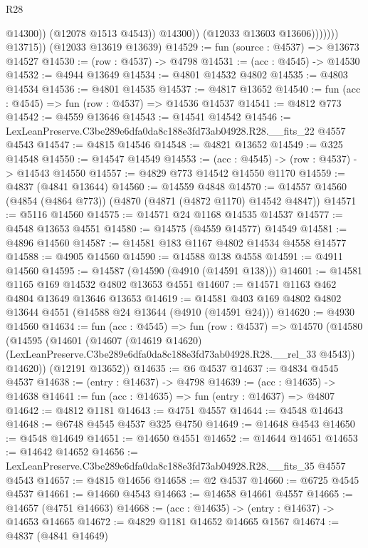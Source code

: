 \begin{lexlean}{R28}
\begin{coremodule}
                              @14300))
                          (@12078 @1513 @4543))
                        @14300))
                    (@12033 @13603 @13606)))))))
        @13715))
    (@12033 @13619 @13639)
@14529 := fun (source : @4537) => @13673 @14527
@14530 := (row : @4537) -> @4798
@14531 := (acc : @4545) -> @14530
@14532 := @4944 @13649
@14534 := @4801 @14532 @4802
@14535 := @4803 @14534
@14536 := @4801 @14535
@14537 := @4817 @13652
@14540 := fun (acc : @4545) => fun (row : @4537) => @14536 @14537
@14541 := @4812 @773
@14542 := @4559 @13646
@14543 := @14541 @14542
@14546 := LexLeanPreserve.C3be289e6dfa0da8c188e3fd73ab04928.R28.__fits_22 @4557 @4543
@14547 := @4815 @14546
@14548 := @4821 @13652
@14549 := @325 @14548
@14550 := @14547 @14549
@14553 := (acc : @4545) -> (row : @4537) -> @14543 @14550
@14557 := @4829 @773 @14542 @14550 @1170
@14559 := @4837 (@4841 @13644)
@14560 := @14559 @4848
@14570 := @14557 @14560 (@4854 (@4864 @773)) (@4870 (@4871 (@4872 @1170) @14542 @4847))
@14571 := @5116 @14560
@14575 := @14571 @24 @1168 @14535 @14537
@14577 := @4548 @13653 @4551
@14580 := @14575 (@4559 @14577) @14549
@14581 := @4896 @14560
@14587 := @14581 @183 @1167 @4802 @14534 @4558 @14577
@14588 := @4905 @14560
@14590 := @14588 @138 @4558
@14591 := @4911 @14560
@14595 := @14587 (@14590 (@4910 (@14591 @138)))
@14601 := @14581 @1165 @169 @14532 @4802 @13653 @4551
@14607 := @14571 @1163 @462 @4804 @13649 @13646 @13653
@14619 := @14581 @403 @169 @4802 @4802 @13644 @4551 (@14588 @24 @13644 (@4910 (@14591 @24)))
@14620 := @4930 @14560
@14634 := fun (acc : @4545) =>
  fun (row : @4537) =>
  @14570
    (@14580
      (@14595
        (@14601
          (@14607
            (@14619 @14620)
            (LexLeanPreserve.C3be289e6dfa0da8c188e3fd73ab04928.R28.__rel_33 @4543))
          @14620))
      (@12191 @13652))
@14635 := @6 @4537
@14637 := @4834 @4545 @4537
@14638 := (entry : @14637) -> @4798
@14639 := (acc : @14635) -> @14638
@14641 := fun (acc : @14635) => fun (entry : @14637) => @4807
@14642 := @4812 @1181
@14643 := @4751 @4557
@14644 := @4548 @14643
@14648 := @6748 @4545 @4537 @325 @4750
@14649 := @14648 @4543
@14650 := @4548 @14649
@14651 := @14650 @4551
@14652 := @14644 @14651
@14653 := @14642 @14652
@14656 := LexLeanPreserve.C3be289e6dfa0da8c188e3fd73ab04928.R28.__fits_35 @4557 @4543
@14657 := @4815 @14656
@14658 := @2 @4537
@14660 := @6725 @4545 @4537
@14661 := @14660 @4543
@14663 := @14658 @14661 @4557
@14665 := @14657 (@4751 @14663)
@14668 := (acc : @14635) -> (entry : @14637) -> @14653 @14665
@14672 := @4829 @1181 @14652 @14665 @1567
@14674 := @4837 (@4841 @14649)

\end{coremodule}
\end{lexlean}
